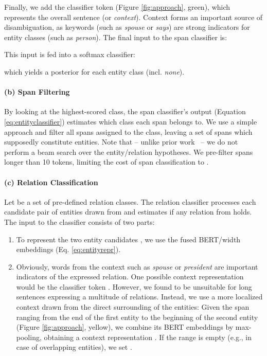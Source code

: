 \documentclass{ecai}
\begin{document}
Finally, we add the classifier token  (Figure \ref{fig:approach}, green), which represents the overall sentence (or {\it context}). Context forms an important source of disambiguation, as keywords (such as {\it spouse} or {\it says}) are strong indicators for entity classes (such as {\it person}).
The final input to the span classifier is: 

This input is fed into a softmax classifier:

which yields a posterior for each entity class (incl. {\it none}). 

\paragraph{(b) Span Filtering}
By looking at the highest-scored class, the span classifier's output (Equation \ref{eq:entityclassifier}) estimates which class each span belongs to. We use a simple approach and filter all spans assigned to the  class, leaving a set of spans  which supposedly constitute entities. Note that -- unlike prior work~\cite{miwa:2014:table,luan:2018:scierc} -- we do not perform a beam search over the entity/relation hypotheses. We pre-filter spans longer than 10 tokens, limiting the cost of span classification to . 

\paragraph{(c) Relation Classification}
Let  be a set of pre-defined relation classes. The relation classifier processes each candidate pair  of entities drawn from  and estimates if any relation from   holds. 
The input to the classifier consists of two parts:
\begin{enumerate}
    \item To represent the two entity candidates , we use the fused BERT/width embeddings   (Eq.  \ref{eq:entityrepr}).  \item 
Obviously, words from the context such as {\it spouse} or {\it president} are important indicators of the expressed relation. One possible context representation would be the classifier token . However, we found  to be unsuitable for long sentences expressing a multitude of relations. Instead, we use a more localized context drawn from the direct surrounding of the entities: Given the span ranging from the end of the first entity to the beginning of the second entity (Figure \ref{fig:approach}, yellow), we combine its BERT embeddings by max-pooling, obtaining a context representation . If the range is empty (e.g., in case of overlapping entities), we set .
\end{enumerate}
\end{document}

